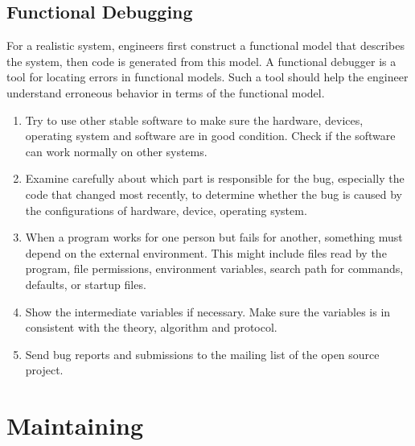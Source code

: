 \documentclass[draftclsnofoot,journal,onecolumn,12pt]{IEEEtran}
\begin{document}

\subsection{Functional Debugging}
For a realistic system, engineers first construct a functional model that describes the system, then code is generated from this model. A functional debugger is a tool for locating errors in functional models. Such a tool should help the engineer understand erroneous behavior in terms of the functional model.

\begin{enumerate}
  \item Try to use other stable software to make sure the hardware, devices, operating system and software are in good condition. Check if the software can work normally on other systems.
  \item Examine carefully about which part is responsible for the bug, especially the code that changed most recently, to determine whether the bug is caused by the configurations of hardware, device, operating system.
  \item When a program works for one person but fails for another, something must depend on the external environment. This might include files read by the program, file permissions, environment variables, search path for commands, defaults, or startup files.
  \item Show the intermediate variables if necessary. Make sure the variables is in consistent with the theory, algorithm and protocol.
  \item Send bug reports and submissions to the mailing list of the open source project.
\end{enumerate}

\section{Maintaining}

\end{document}
